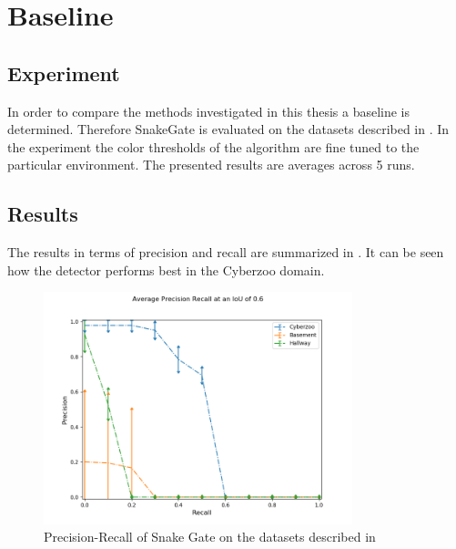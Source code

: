 \section{Baseline}


\subsection{Experiment}

In order to compare the methods investigated in this thesis a baseline is determined. Therefore SnakeGate is evaluated on the datasets described in . In the experiment the color thresholds of the algorithm are fine tuned to the particular environment. The presented results are averages across 5 runs.


\subsection{Results}

The results in terms of precision and recall are summarized in . It can be seen how the detector performs best in the Cyberzoo domain.

\begin{figure}
	\includegraphics[width=0.8\textwidth]{fig/snake_results_real}
	\caption{Precision-Recall of Snake Gate on the datasets described in }
	\label{fig:snake_results_real}
\end{figure}

\fi